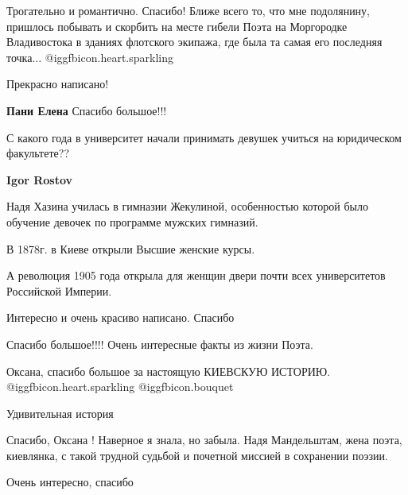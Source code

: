  
 
 
 
 
\zzSecCmt

\begin{itemize} %

Трогательно и романтично. Спасибо! Ближе всего то, что мне подолянину, пришлось
побывать и скорбить на месте гибели Поэта на Моргородке Владивостока в зданиях
флотского экипажа, где была та самая его последняя точка...  @igg{fbicon.heart.sparkling} 

Прекрасно написано!

\textbf{Пани Елена} Спасибо большое!!!

С какого года в университет начали принимать девушек учиться на юридическом факультете??

\begin{itemize} %
\textbf{Igor Rostov} 

Надя Хазина училась в гимназии Жекулиной, особенностью которой было обучение
девочек по программе мужских гимназий.

В 1878г. в Киеве открыли Высшие женские курсы.

А революция 1905 года открыла для женщин двери почти всех университетов
Российской Империи.

\end{itemize} %

Интересно и очень красиво написано. Спасибо

Спасибо большое!!!! Очень интересные факты из жизни Поэта.

Оксана, спасибо большое за настоящую КИЕВСКУЮ ИСТОРИЮ.  @igg{fbicon.heart.sparkling}  @igg{fbicon.bouquet} 

Удивительная история


Спасибо, Оксана ! Наверное я знала, но забыла. Надя Мандельштам, жена поэта,
киевлянка, с такой трудной судьбой и почетной миссией в сохранении поэзии.

Очень интересно, спасибо


\end{itemize}
